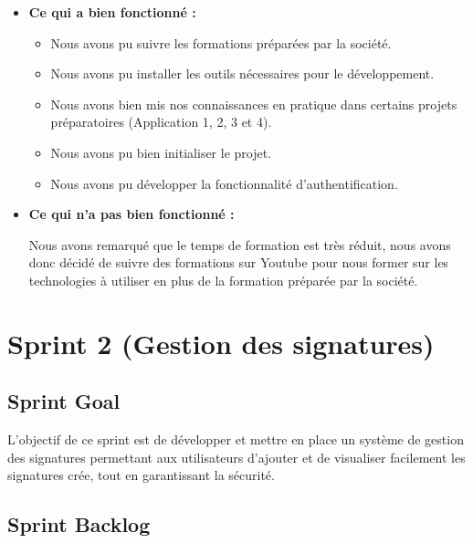 \begin{itemize}
  \item \textbf{Ce qui a bien fonctionné :}
  \begin{itemize}
    \item Nous avons pu suivre les formations préparées par la société.
    \item Nous avons pu installer les outils nécessaires pour le développement.
    \item Nous avons bien mis nos connaissances en pratique dans certains projets préparatoires (Application 1, 2, 3 et 4).
    \item Nous avons pu bien initialiser le projet.
    \item Nous avons pu développer la fonctionnalité d'authentification.
  \end{itemize}
  \item \textbf{Ce qui n'a pas bien fonctionné :}
  
  Nous avons remarqué que le temps de formation est très réduit, nous avons donc décidé de suivre des formations sur Youtube pour nous former sur les technologies à utiliser en plus de la formation préparée par la société.
\end{itemize}

\section{Sprint 2 (Gestion des signatures)}

\subsection{Sprint Goal}

L'objectif de ce sprint est de développer et mettre en place un système de gestion des signatures permettant aux utilisateurs d'ajouter et de visualiser facilement les signatures crée, tout en garantissant la sécurité.

\subsection{Sprint Backlog}


